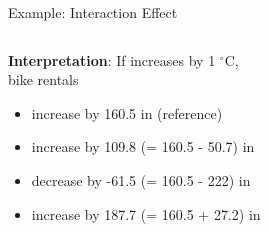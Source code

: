\documentclass[10pt,compress,t,notes=noshow, xcolor=table]{beamer}
\begin{document}
\begin{frame}{Example: Interaction Effect}
\vfill
\pause
\begin{columns}[T, totalwidth=\textwidth]
\begin{column}{0.65\linewidth}
\textbf{Interpretation}: If  increases by 1 $^{\circ}$C, \\bike rentals
\begin{itemize}[<+->]
    \item increase by 160.5 in  (reference)
    \item increase by 109.8 (= 160.5 - 50.7) in 
    \item decrease by -61.5 (= 160.5 - 222) in 
    \item increase by 187.7 (= 160.5 + 27.2) in 
\end{itemize} %
\end{column}
\begin{column}{0.35\linewidth}
\end{column}
\end{columns}
\end{frame}
\end{document}
